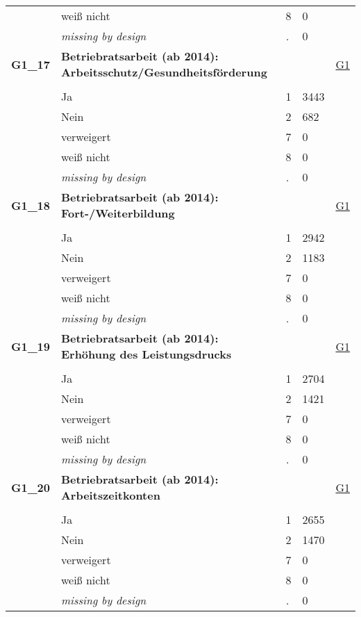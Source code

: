 \begin{longtable}{| L{2.65cm} | L{8cm} | C{1.5cm} | R{1.25cm} | C{2.25cm}  |}
   & weiß nicht & 8 & 0 &  \\ 
   & \textit{missing by design} & \textit{.} & 0 &  \\ 
   \midrule
\textbf{G1\_17}\label{var:G1:17} & \textbf{Betriebratsarbeit (ab 2014): Arbeitsschutz/Gesundheitsförderung} &  &  & \hyperref[G1]{G1} \\ 
   &  &  &  &  \\ 
   & Ja & 1 & 3443 &  \\ 
   & Nein & 2 & 682 &  \\ 
   & verweigert & 7 & 0 &  \\ 
   & weiß nicht & 8 & 0 &  \\ 
   & \textit{missing by design} & \textit{.} & 0 &  \\ 
   \midrule
\textbf{G1\_18}\label{var:G1:18} & \textbf{Betriebratsarbeit (ab 2014): Fort-/Weiterbildung} &  &  & \hyperref[G1]{G1} \\ 
   &  &  &  &  \\ 
   & Ja & 1 & 2942 &  \\ 
   & Nein & 2 & 1183 &  \\ 
   & verweigert & 7 & 0 &  \\ 
   & weiß nicht & 8 & 0 &  \\ 
   & \textit{missing by design} & \textit{.} & 0 &  \\ 
   \midrule
\textbf{G1\_19}\label{var:G1:19} & \textbf{Betriebratsarbeit (ab 2014): Erhöhung des Leistungsdrucks} &  &  & \hyperref[G1]{G1} \\ 
   &  &  &  &  \\ 
   & Ja & 1 & 2704 &  \\ 
   & Nein & 2 & 1421 &  \\ 
   & verweigert & 7 & 0 &  \\ 
   & weiß nicht & 8 & 0 &  \\ 
   & \textit{missing by design} & \textit{.} & 0 &  \\ 
   \midrule
\textbf{G1\_20}\label{var:G1:20} & \textbf{Betriebratsarbeit (ab 2014): Arbeitszeitkonten} &  &  & \hyperref[G1]{G1} \\ 
   &  &  &  &  \\ 
   & Ja & 1 & 2655 &  \\ 
   & Nein & 2 & 1470 &  \\ 
   & verweigert & 7 & 0 &  \\ 
   & weiß nicht & 8 & 0 &  \\ 
   & \textit{missing by design} & \textit{.} & 0 &  \\ 

\end{longtable}
